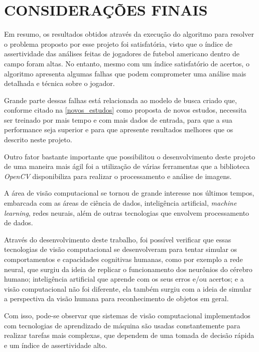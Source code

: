 \chapter{\textbf{CONSIDERAÇÕES FINAIS}}
\label{consideracoes_finais}

Em resumo, os resultados obtidos através da execução do algoritmo para resolver o problema proposto por esse projeto foi satisfatória, visto que o índice de assertividade das análises feitas de jogadores de futebol americano dentro de campo foram altas. No entanto, mesmo com um índice satisfatório de acertos, o algoritmo apresenta algumas falhas que podem comprometer uma análise mais detalhada e técnica sobre o jogador.

Grande parte dessas falhas está relacionada ao modelo de busca criado que, conforme citado na \autoref{novos_estudos} como proposta de novos estudos, necessita ser treinado por mais tempo e com mais dados de entrada, para que a sua performance seja superior e para que apresente resultados melhores que os descrito neste projeto.

Outro fator bastante importante que possibilitou o desenvolvimento deste projeto de uma maneira mais ágil foi a utilização de várias ferramentas que a biblioteca \textit{OpenCV} disponibiliza para realizar o processamento e análise de imagens.

A área de visão computacional se tornou de grande interesse nos últimos tempos, embarcada com as áreas de ciência de dados, inteligência artificial, \textit{machine learning}, redes neurais, além de outras tecnologias que envolvem processamento de dados.

Através do desenvolvimento deste trabalho, foi possível verificar que essas tecnologias de visão computacional se desenvolveram para tentar simular os comportamentos e capacidades cognitivas humanas, como por exemplo a rede neural, que surgiu da ideia de replicar o funcionamento dos neurônios do cérebro humano; inteligência artificial que aprende com os seus erros e/ou acertos; e a visão computacional não foi diferente, ela também surgiu com a ideia de simular a perspectiva da visão humana para reconhecimento de objetos em geral.

Com isso, pode-se observar que sistemas de visão computacional implementados com tecnologias de aprendizado de máquina são usadas constantemente para realizar tarefas mais complexas, que dependem de uma tomada de decisão rápida e um índice de assertividade alto.


